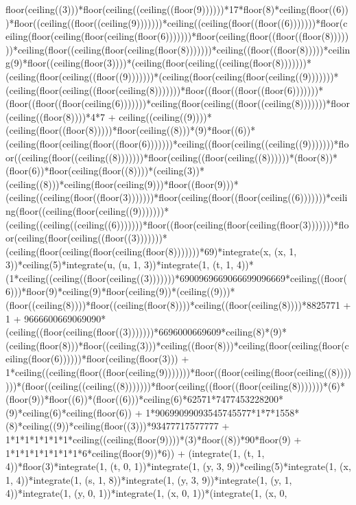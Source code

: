 floor(ceiling((3)))*floor(ceiling((ceiling((floor(9))))))*17*floor(8)*ceiling(floor((6)))*floor((ceiling((floor((ceiling(9)))))))*ceiling((ceiling(floor((floor((6)))))))*floor(ceiling(floor(ceiling(floor(ceiling(floor(6)))))))*floor(ceiling(floor((floor((floor(8)))))))*ceiling(floor((ceiling(floor(ceiling(floor(8)))))))*ceiling((floor((floor(8)))))*ceiling(9)*floor((ceiling(floor(3))))*(ceiling(floor(ceiling((ceiling(floor(8)))))))*(ceiling(floor(ceiling((floor((9)))))))*(ceiling(floor(ceiling(floor(ceiling((9)))))))*(ceiling(floor(ceiling((floor(ceiling(8)))))))*floor((floor((floor((floor(6)))))))*(floor((floor((floor(ceiling(6)))))))*ceiling(floor(ceiling((floor((ceiling(8)))))))*floor(ceiling((floor(8))))*4*7 + ceiling((ceiling((9))))*(ceiling(floor((floor(8)))))*floor(ceiling((8)))*(9)*floor((6))*(ceiling(floor(ceiling(floor((floor(6)))))))*ceiling((floor(ceiling((ceiling((9)))))))*floor((ceiling(floor((ceiling((8)))))))*floor(ceiling((floor(ceiling((8))))))*(floor(8))*(floor(6))*floor(ceiling(floor((8))))*(ceiling(3))*(ceiling((8)))*ceiling(floor(ceiling(9)))*floor((floor(9)))*(ceiling((ceiling(floor((floor(3)))))))*floor(ceiling(floor((floor(ceiling((6)))))))*ceiling(floor((ceiling(floor(ceiling((9)))))))*(ceiling((ceiling((ceiling((6)))))))*floor((floor(ceiling(floor(ceiling(floor(3)))))))*floor(ceiling(floor(ceiling((floor((3)))))))*(ceiling(floor(ceiling(floor(ceiling(floor(8)))))))*69)*integrate(x, (x, 1, 3))*ceiling(5)*integrate(u, (u, 1, 3))*integrate(1, (t, 1, 4))*(1*ceiling((ceiling((floor(ceiling((3)))))))*6900969669066699096669*ceiling((floor(6)))*floor(9)*ceiling(9)*floor(ceiling(9))*(ceiling((9)))*(floor((ceiling(8))))*floor((ceiling(floor(8))))*ceiling((floor(ceiling(8))))*8825771 + 1 + 9666600669069090*(ceiling((floor(ceiling(floor((3)))))))*6696000669609*ceiling(8)*(9)*(ceiling(floor(8)))*floor((ceiling(3)))*ceiling((floor(8)))*ceiling(floor(ceiling(floor(ceiling(floor(6))))))*floor(ceiling(floor(3))) + 1*ceiling((ceiling(floor((floor(ceiling(9)))))))*floor((floor(ceiling(floor(ceiling((8)))))))*(floor((ceiling((ceiling((8)))))))*floor(ceiling((floor((floor(ceiling(8)))))))*(6)*(floor(9))*floor((6))*(floor((6)))*ceiling(6)*62571*7477453228200*(9)*ceiling(6)*ceiling(floor(6)) + 1*90699099093545745577*1*7*1558*(8)*ceiling((9))*ceiling(floor((3)))*93477717577777 + 1*1*1*1*1*1*1*ceiling((ceiling(floor(9))))*(3)*floor((8))*90*floor(9) + 1*1*1*1*1*1*1*1*6*ceiling(floor(9))*6)) + (integrate(1, (t, 1, 4))*floor(3)*integrate(1, (t, 0, 1))*integrate(1, (y, 3, 9))*ceiling(5)*integrate(1, (x, 1, 4))*integrate(1, (s, 1, 8))*integrate(1, (y, 3, 9))*integrate(1, (y, 1, 4))*integrate(1, (y, 0, 1))*integrate(1, (x, 0, 1))*(integrate(1, (x, 0, 